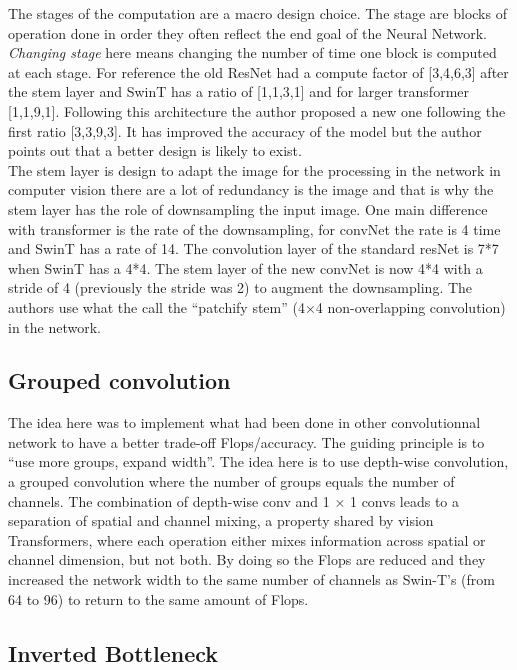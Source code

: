 The stages of the computation are a macro design choice. The stage are blocks of operation done in order they often reflect the end goal of the Neural Network. \textit{Changing stage} here means changing the number of time one block is computed at each stage. For reference the old ResNet had a compute factor of [3,4,6,3] after the stem layer and SwinT has a ratio of [1,1,3,1] and for larger transformer [1,1,9,1]. Following this architecture the author proposed a new one following the first ratio [3,3,9,3]. It has improved the accuracy of the model but the author points out that a better design is likely to exist.\\

The stem layer is design to adapt the image for the processing in the network in computer vision there are a lot of redundancy is the image and that is why the stem layer has the role of downsampling the input image. One main difference with transformer is the rate of the downsampling, for convNet the rate is 4 time and SwinT has a rate of 14. The convolution layer of the standard resNet is 7*7 when SwinT has a 4*4. The stem layer of the new convNet is now 4*4 with a stride of 4 (previously the stride was 2) to augment the downsampling. The authors use what the call the “patchify stem” (4×4 non-overlapping convolution) in the network.\\

\subsection*{Grouped convolution}

The idea here was to implement what had been done in other convolutionnal network to have a better trade-off Flops/accuracy. The guiding principle is to “use more groups, expand width”. The idea here is to use depth-wise convolution, a grouped convolution where the number of groups equals the number of channels. The combination of depth-wise conv and 1 × 1 convs leads to a separation of spatial and channel mixing, a property shared by vision Transformers, where each operation either mixes information across spatial or channel dimension, but not both. By doing so the Flops are reduced and they increased the network width to the same number of channels as Swin-T’s (from 64 to 96)
to return to the same amount of Flops.

\subsection*{Inverted Bottleneck}

